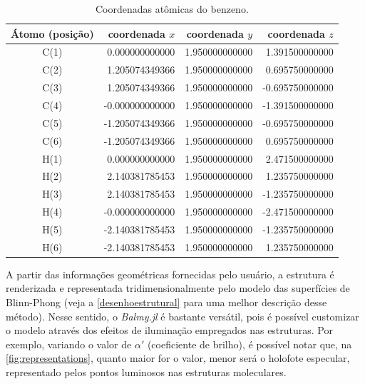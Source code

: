 \begin{table}[htb]
	\centering
	\caption{\label{tab:coords} Coordenadas atômicas do benzeno.}	
	\begin{tabular}{crrr}
		\toprule
		\textbf{Átomo (posição)} & coordenada $x$ & coordenada $y$ & coordenada $z$
		\\ 
		\midrule
C(1)  &    0.000000000000  &   1.950000000000  &   1.391500000000  \\
C(2)  &    1.205074349366  &   1.950000000000  &   0.695750000000  \\
C(3)  &    1.205074349366  &   1.950000000000  &  -0.695750000000  \\
C(4)  &   -0.000000000000  &   1.950000000000  &  -1.391500000000  \\
C(5)  &   -1.205074349366  &   1.950000000000  &  -0.695750000000  \\
C(6)  &   -1.205074349366  &   1.950000000000  &   0.695750000000  \\
H(1)  &    0.000000000000  &   1.950000000000  &   2.471500000000  \\
H(2)  &    2.140381785453  &   1.950000000000  &   1.235750000000  \\
H(3)  &    2.140381785453  &   1.950000000000  &  -1.235750000000  \\
H(4)  &   -0.000000000000  &   1.950000000000  &  -2.471500000000  \\
H(5)  &   -2.140381785453  &   1.950000000000  &  -1.235750000000  \\
H(6)  &   -2.140381785453  &   1.950000000000  &   1.235750000000  \\
    \bottomrule
	\end{tabular}
\end{table}

A partir das informações geométricas fornecidas pelo usuário, a estrutura é renderizada e representada tridimensionalmente pelo modelo das superfícies de Blinn-Phong (veja a \autoref{desenhoestrutural} para uma melhor descrição desse método). Nesse sentido, o \textit{Balmy.jl} é bastante versátil, pois é possível customizar o modelo através dos efeitos de iluminação empregados nas estruturas. Por exemplo, variando o valor de $\alpha'$ (coeficiente de brilho), é possível notar que, na \autoref{fig:representations}, quanto maior for o valor, menor será o holofote especular, representado pelos pontos luminosos nas estruturas moleculares.


